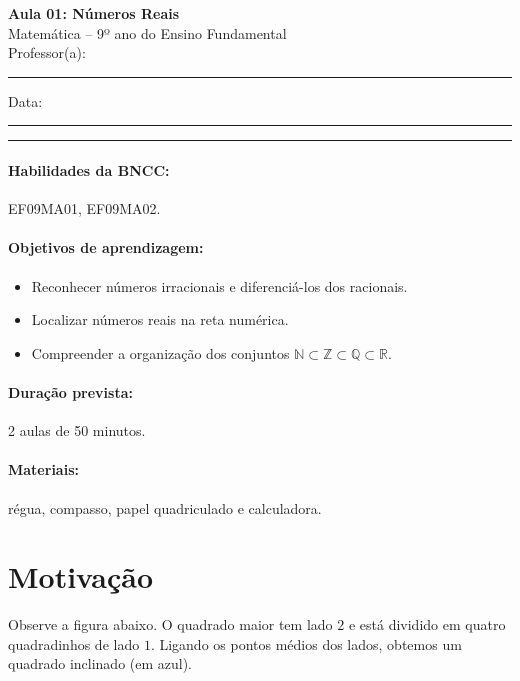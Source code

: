 \documentclass[11pt,a4paper]{article}
\newcommand{\numaula}{01}
\newcommand{\tituloaula}{Números Reais}
\begin{document}
\begin{center}
  {\Large\bfseries Aula \numaula: \tituloaula}\\[4pt]
  {\large Matemática -- 9º ano do Ensino Fundamental}\\[2pt]
  Professor(a): \rule{6cm}{0.4pt} \qquad Data: \rule{3cm}{0.4pt}
\end{center}
\noindent\rule{\linewidth}{0.8pt}

\paragraph{Habilidades da BNCC:} EF09MA01, EF09MA02.

\paragraph{Objetivos de aprendizagem:}
\begin{itemize}[nosep]
  \item Reconhecer números irracionais e diferenciá-los dos racionais.
  \item Localizar números reais na reta numérica.
  \item Compreender a organização dos conjuntos $\mathbb{N} \subset \mathbb{Z} \subset \mathbb{Q} \subset \mathbb{R}$.
\end{itemize}

\paragraph{Duração prevista:} 2 aulas de 50 minutos.

\paragraph{Materiais:} régua, compasso, papel quadriculado e calculadora.

\section{Motivação}

Observe a figura abaixo. O quadrado maior tem lado $2$ e está dividido em
quatro quadradinhos de lado $1$. Ligando os pontos médios dos lados,
obtemos um quadrado inclinado (em azul).

\begin{center}
\end{center}
\end{document}
